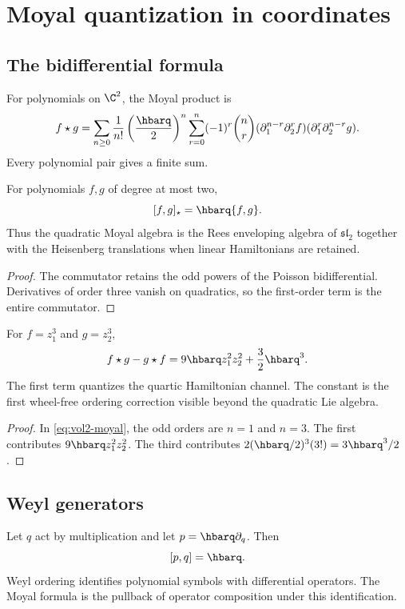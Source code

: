 \chapter{Moyal quantization in coordinates}
\section{The bidifferential formula}
For polynomials on $\C^2$, the Moyal product is
\begin{equation}\label{eq:vol2-moyal}
 f\star g
 =\sum_{n\ge0}\frac1{n!}\left(\frac{\hbarq}{2}\right)^n
 \sum_{r=0}^n(-1)^r\binom nr
 (\partial_1^{n-r}\partial_2^rf)
 (\partial_1^r\partial_2^{n-r}g).
\end{equation}
Every polynomial pair gives a finite sum.

\begin{theorem}
For polynomials $f,g$ of degree at most two,
\[
 [f,g]_\star=\hbarq\{f,g\}.
\]
Thus the quadratic Moyal algebra is the Rees enveloping algebra of $\mathfrak{sl}_2$ together with the Heisenberg translations when linear Hamiltonians are retained.
\end{theorem}
\begin{proof}
The commutator retains the odd powers of the Poisson bidifferential.  Derivatives of order three vanish on quadratics, so the first-order term is the entire commutator.
\end{proof}

\begin{calculation}
For $f=z_1^3$ and $g=z_2^3$,
\[
 f\star g-g\star f
 =9\hbarq z_1^2z_2^2+\frac32\hbarq^3.
\]
The first term quantizes the quartic Hamiltonian channel.  The constant is the first wheel-free ordering correction visible beyond the quadratic Lie algebra.
\end{calculation}
\begin{proof}
In \eqref{eq:vol2-moyal}, the odd orders are $n=1$ and $n=3$.  The first contributes $9\hbarq z_1^2z_2^2$.  The third contributes $2(\hbarq/2)^3(3!)=3\hbarq^3/2$.
\end{proof}

\section{Weyl generators}
Let $q$ act by multiplication and let $p=\hbarq\partial_q$.  Then
\[
 [p,q]=\hbarq.
\]
Weyl ordering identifies polynomial symbols with differential operators.  The Moyal formula is the pullback of operator composition under this identification.


